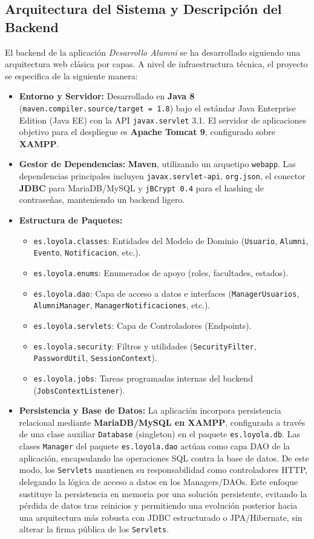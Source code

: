 \documentclass{report}
\begin{document}
\subsection{Arquitectura del Sistema y Descripción del Backend}
El backend de la aplicación \textit{Desarrollo Alumni} se ha desarrollado siguiendo una arquitectura web clásica por capas. A nivel de infraestructura técnica, el proyecto se especifica de la siguiente manera:
\begin{itemize}
    \item \textbf{Entorno y Servidor:} Desarrollado en \textbf{Java 8} (\texttt{maven.compiler.source/target = 1.8}) bajo el estándar Java Enterprise Edition (Java EE) con la API \texttt{javax.servlet} 3.1. El servidor de aplicaciones objetivo para el despliegue es \textbf{Apache Tomcat 9}, configurado sobre \textbf{XAMPP}.
    \item \textbf{Gestor de Dependencias:} \textbf{Maven}, utilizando un arquetipo \texttt{webapp}. Las dependencias principales incluyen \texttt{javax.servlet-api}, \texttt{org.json}, el conector \textbf{JDBC} para MariaDB/MySQL y \texttt{jBCrypt 0.4} para el hashing de contraseñas, manteniendo un backend ligero.
    \item \textbf{Estructura de Paquetes:}
    \begin{itemize}
        \item \texttt{es.loyola.classes}: Entidades del Modelo de Dominio (\texttt{Usuario}, \texttt{Alumni}, \texttt{Evento}, \texttt{Notificacion}, etc.).
        \item \texttt{es.loyola.enums}: Enumerados de apoyo (roles, facultades, estados).
        \item \texttt{es.loyola.dao}: Capa de acceso a datos e interfaces (\texttt{ManagerUsuarios}, \texttt{AlumniManager}, \texttt{ManagerNotificaciones}, etc.).
        \item \texttt{es.loyola.servlets}: Capa de Controladores (Endpoints).
        \item \texttt{es.loyola.security}: Filtros y utilidades (\texttt{SecurityFilter}, \texttt{PasswordUtil}, \texttt{SessionContext}).
        \item \texttt{es.loyola.jobs}: Tareas programadas internas del backend (\texttt{JobsContextListener}).
    \end{itemize}
    \item \textbf{Persistencia y Base de Datos:} La aplicación incorpora persistencia relacional mediante \textbf{MariaDB/MySQL en XAMPP}, configurada a través de una clase auxiliar \texttt{Database} (singleton) en el paquete \texttt{es.loyola.db}. Las clases \texttt{Manager} del paquete \texttt{es.loyola.dao} actúan como capa DAO de la aplicación, encapsulando las operaciones SQL contra la base de datos. De este modo, los \texttt{Servlets} mantienen su responsabilidad como controladores HTTP, delegando la lógica de acceso a datos en los Managers/DAOs. Este enfoque sustituye la persistencia en memoria por una solución persistente, evitando la pérdida de datos tras reinicios y permitiendo una evolución posterior hacia una arquitectura más robusta con JDBC estructurado o JPA/Hibernate, sin alterar la firma pública de los \texttt{Servlets}.
\end{itemize}
\end{document}
